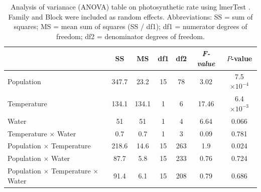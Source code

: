 \documentclass[11pt, oneside]{article}
\newcommand{\pkg}[1]{{\fontseries{b}\selectfont #1}}
\begin{document}
\begin{table}[htbp]
	\fontsize{10}{12}
	\selectfont
	\caption[ANOVA table, photosynthesis]{Analysis of varianace (ANOVA) table on photosynthetic rate using \pkg{lmerTest} \citep{Kuznetsova_etal_2016}. Family and Block were included as random effects. Abbreviations: SS = sum of squares; MS = mean sum of squares (SS / df1); df1 = numerator degrees of freedom; df2 = denominator degrees of freedom.}
	\begin{center}
	\begin{tabular}{lcccccc}
	\toprule

  & SS & MS & df1 & df2 & \em{F}-value & $P$-value \\ \midrule
  Population & 347.7 & 
    23.2 & 15 &
    78 & 3.02 &
    7.5 $\times10^{-4}$ \\
  Temperature & 134.1 & 
    134.1 & 1 &
    6 & 17.46 &
    6.4 $\times10^{-3}$ \\
  Water & 51 & 
    51 & 1 &
    4 & 6.64 &
    0.066 \\
  Temperature $\times$ Water & 0.7 & 
    0.7 & 
    1 & 
    3 & 
    0.09 &
    0.781 \\
  Population $\times$ Temperature & 218.6 & 
    14.6 & 
    15 & 
    263 & 
    1.9 &
    0.024 \\
  Population $\times$ Water & 87.7 & 
    5.8 & 
    15 &
    233 &
    0.76 & 
    0.724 \\
  Population $\times$ Temperature $\times$ Water & 
    91.4 & 
    6.1 & 
    15 & 
    208 & 
    0.79 & 
    0.686 \\
	\bottomrule
	\end{tabular}
	\label{table:TableS_fitPhoto}
	\end{center}
\end{table}

\end{document}
